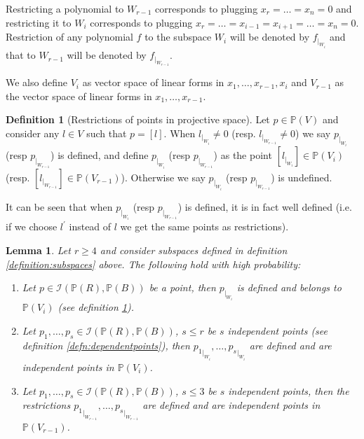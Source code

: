 \documentclass[12pt]{caltech_thesis}
\theoremstyle{plain}
\newtheorem{lemma}{Lemma}
\theoremstyle{definition}
\newtheorem{definition}{Definition}
\newcommand{\MI}{\mathcal{I}}
\newcommand{\PP}{\mathbb{P}}
\begin{document}
Restricting a polynomial to $W_{r-1}$ corresponds to plugging $x_r =\ldots = x_n=0$ and restricting it to $W_i$ corresponds to
plugging $x_r = \ldots = x_{i-1} = x_{i+1} = \ldots = x_n=0$. Restriction of any polynomial $f$ to the subspace
$W_i$ will be denoted by $f_{|_{W_i}}$ and that to $W_{r-1}$ will be denoted by $f_{|_{W_{r-1}}}$.

We also define $V_i$ as vector space of linear forms in $x_1,\ldots,x_{r-1},x_i$ and $V_{r-1}$ as the vector
space of linear forms in $x_1,\ldots,x_{r-1}$.

\begin{definition}[Restrictions of points in projective space]\label{defn:restriction}
Let $p\in \PP(V)$ and consider any $l\in V$ such that $p=[l]$. When $l_{|_{W_i}} \neq 0$ (resp. $l_{|_{W_{r-1}}}\neq 0$)
we say $p_{|_{W_i}}$ (resp $p_{|_{W_{r-1}}}$) is defined, 
and define $p_{|_{W_i}}$ (resp $p_{|_{W_{r-1}}}$) as the point $[l_{|_{W_i}}] \in \PP(V_i)$ (resp. $[l_{|_{W_{r-1}}}] \in \PP(V_{r-1})$). 
Otherwise we say  $p_{|_{W_i}}$ (resp $p_{|_{W_{r-1}}}$) is undefined.

It can be seen that when $p_{|_{W_i}}$ (resp $p_{|_{W_{r-1}}}$) is defined, it is in fact well defined (i.e. if we choose $l^\prime$ 
instead of $l$ we get the same points as restrictions).
\end{definition}


\begin{lemma}\label{lemma:intersectionproj}
 Let $r\geq 4$ and consider subspaces defined in definition \ref{definition:subspaces} above. The following hold
 with high probability:
\begin{enumerate}
\item \label{bullet:nonconstantforms} Let $p\in \MI(\PP(R),\PP(B))$ be a point, then 
${p}_{|_{W_i}}$ is defined and belongs to $\PP(V_i)$ (see definition \ref{defn:restriction}).
\item \label{bullet:independence}Let $p_1,\ldots,p_s \in \MI(\PP(R),\PP(B))$, $s\leq r$ be $s$ independent 
points (see definition \ref{defn:dependentpoints}), then ${p_1}_{|_{W_i}},\ldots,{p_s}_{|_{W_i}}$ are defined and are independent 
points in $\PP(V_i)$. 

\item \label{bullet:formslines}Let $p_1,\ldots,p_s \in \MI(\PP(R),\PP(B))$, $s\leq 3$ be $s$ independent points, 
then the restrictions ${p_1}_{|_{W_{r-1}}},\ldots,{p_s}_{|_{W_{r-1}}}$ are defined and are independent points in $\PP(V_{r-1})$.
\end{enumerate}
\end{lemma}
\end{document}
